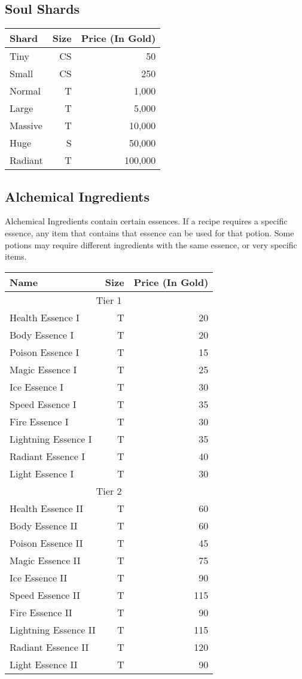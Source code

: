 \subsection{Soul Shards}\label{subsec:soulShards}
\begin{longtable}{l | r | r}
	Shard & Size & Price (In Gold)\\ \hline
	Tiny & CS & 50\\
	Small & CS & 250\\
	Normal & T & 1,000\\
	Large & T & 5,000\\
	Massive & T & 10,000\\
	Huge & S & 50,000\\
	Radiant & T & 100,000\\
\end{longtable}


\subsection{Alchemical Ingredients}\label{subsec:alchemicalIngredients}
Alchemical Ingredients contain certain essences.
If a recipe requires a specific essence, any item that contains that essence can be used for that potion.
Some potions may require different ingredients with the same essence, or very specific items. \\

\begin{longtable}{l | r | r}
	Name & Size & Price (In Gold)\\
	\hline
	\multicolumn{3}{c}{Tier 1}\\
	\hline
	Health Essence I & T & 20\\
	Body Essence I & T & 20\\
	Poison Essence I & T & 15\\
	Magic Essence I & T & 25\\
	Ice Essence I & T & 30\\
	Speed Essence I & T & 35\\
	Fire Essence I & T & 30\\
	Lightning Essence I & T & 35\\
	Radiant Essence I & T & 40\\
	Light Essence I & T & 30\\
	\hline
	\multicolumn{3}{c}{Tier 2}\\
	\hline
	Health Essence II & T & 60\\
	Body Essence II & T & 60\\
	Poison Essence II & T & 45\\
	Magic Essence II & T & 75\\
	Ice Essence II & T & 90\\
	Speed Essence II & T & 115\\
	Fire Essence II & T & 90\\
	Lightning Essence II & T & 115\\
	Radiant Essence II & T & 120\\
	Light Essence II & T & 90\\
\end{longtable}

